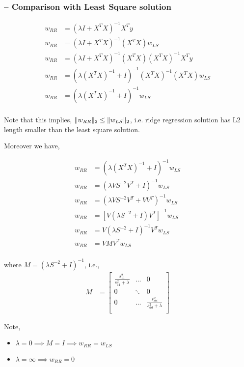 \documentclass{article}
\begin{document}
\subsubsection{-- Comparison with Least Square solution}

\begin{align*}
    w_{RR} &= (\lambda I + X^TX)^{-1}X^Ty\\
    w_{RR} &= (\lambda I + X^TX)^{-1} (X^TX) w_{LS}\\
    w_{RR} &= (\lambda I + X^TX)^{-1} (X^TX) (X^TX)^{-1}X^Ty\\
    w_{RR} &= (\lambda (X^TX)^{-1} + I)^{-1} (X^TX)^{-1} (X^TX) w_{LS}\\
    w_{RR} &= (\lambda (X^TX)^{-1} + I)^{-1} w_{LS}\\
\end{align*}

Note that this implies, $\Vert w_{RR} \Vert_2 \leq \Vert w_{LS} \Vert_2\\$, i.e. ridge regression solution has L2 length smaller than the least square solution.

Moreover we have,

\begin{align*}
    w_{RR} &= (\lambda (X^TX)^{-1} + I)^{-1} w_{LS}\\
    w_{RR} &= (\lambda VS^{-2}V^T + I)^{-1} w_{LS}\\
    w_{RR} &= (\lambda VS^{-2}V^T + VV^T)^{-1} w_{LS}\\
    w_{RR} &= \left[V(\lambda S^{-2} + I)V^T\right]^{-1} w_{LS}\\
    w_{RR} &= V(\lambda S^{-2} + I)^{-1}V^T w_{LS}\\
    w_{RR} &= VMV^T w_{LS}\\
\end{align*}

where $M=(\lambda S^{-2} + I)^{-1}$, i.e., 
\begin{align*}
    M &= \begin{bmatrix}
        \frac{s_{11}^2}{s_{11}^2 + \lambda} & \dots & 0\\
        0 & \ddots & 0\\
        0 & \dots & \frac{s_{dd}^2}{s_{dd}^2 + \lambda}\\
    \end{bmatrix}
\end{align*}

Note,
\begin{itemize}
    \item $\lambda = 0 \implies M=I \implies w_{RR}=w_{LS}$
    \item $\lambda = \infty \implies w_{RR}=0$
\end{itemize}
\end{document}
